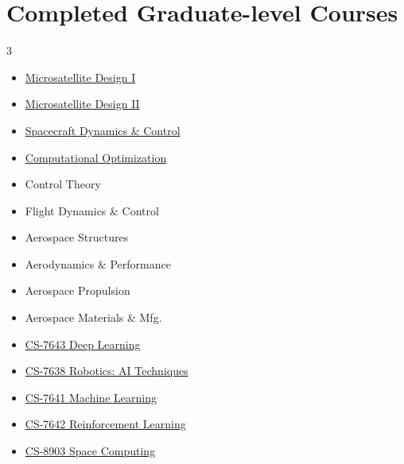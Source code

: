 \documentclass[letterpaper,11pt]{article}
\newcommand{\resumeSubHeadingListStart}{\begin{itemize}[leftmargin=0.0in, label={}]}
\newcommand{\resumeSubHeadingListEnd}{\end{itemize}}
\newcommand{\shiftleft}[2]{\makebox[0pt][r]{\makebox[#1][l]{#2}}}
\newcommand{\cvIcon}[1]{\BeginAccSupp{ActualText={}}#1\EndAccSupp{}}
\def\shiftleft#1#2{}%
\def\faUniversity{}%
\begin{document}
\section[Completed Graduate-level Courses]{\shiftleft{18pt}{\cvIcon{\faUniversity}}Completed Graduate-level Courses}
        \begin{multicols}{3}
            \begin{itemize}[itemsep=-3pt, parsep=4pt]
                \item\small \href{https://sgs.calendar.utoronto.ca/course/aer1520h}{Microsatellite Design I}
                \item\small \href{https://sgs.calendar.utoronto.ca/course/aer1521h}{Microsatellite Design II}
                \item\small \href{https://engineering.calendar.utoronto.ca/course/aer506h1}{Spacecraft Dynamics \& Control}
                \item\small \href{https://sgs.calendar.utoronto.ca/course/aer1415h}{Computational Optimization}
                \item\small Control Theory
                \item\small Flight Dynamics \& Control
                \item\small Aerospace Structures
                \item\small Aerodynamics \& Performance
                \item\small Aerospace Propulsion
                \item\small Aerospace Materials \& Mfg.
                \item\small \href{https://omscs.gatech.edu/cs-7643-deep-learning}{CS-7643 Deep Learning}
                \item\small \href{https://omscs.gatech.edu/cs-7638-robotics-ai-techniques}{CS-7638 Robotics: AI Techniques}
                \item\small \href{https://omscs.gatech.edu/cs-7641-machine-learning}{CS-7641 Machine Learning}
                \item\small \href{https://omscs.gatech.edu/cs-7642-reinforcement-learning}{CS-7642 Reinforcement Learning}
                \item\small \href{https://atillasaadat.com/post/adaptive-telemetry-probe-for-resource-constrained-spacecraft-using-f-prime/}{CS-8903 Space Computing}
            \end{itemize}
        \end{multicols}
        \vspace*{2.0\multicolsep}
\vspace{5pt}
\end{document}

